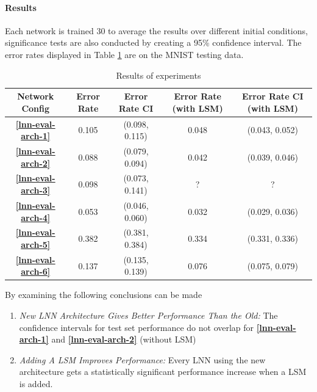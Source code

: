\paragraph{Results}
Each network is trained 30 to average the results over different initial conditions, significance tests are also conducted by creating a 95\% confidence interval. The error rates displayed in Table \ref{tab:mnist-peformance-results} are on the MNIST testing data.

\begin{table}[H]
	\begin{center}
		\begin{tabular}{| c | c | c | c | c |}
			\hline
			\textbf{Network Config} & \textbf{Error Rate} & \textbf{Error Rate CI} & \textbf{Error Rate (with LSM)} & \textbf{Error Rate CI (with LSM)}\\
			\hline
			\hline
			\textbf{\ref{lnn-eval-arch-1}} & 0.105 & (0.098, 0.115) & 0.048 & (0.043, 0.052)\\
			\textbf{\ref{lnn-eval-arch-2}} & 0.088 & (0.079, 0.094) & 0.042 & (0.039, 0.046)\\
			\textbf{\ref{lnn-eval-arch-3}} & 0.098 & (0.073, 0.141) & ? & ?\\
			\textbf{\ref{lnn-eval-arch-4}} & 0.053 & (0.046, 0.060) & 0.032 & (0.029, 0.036)\\
			\textbf{\ref{lnn-eval-arch-5}} & 0.382 & (0.381, 0.384) & 0.334 & (0.331, 0.336)\\
			\textbf{\ref{lnn-eval-arch-6}} & 0.137 & (0.135, 0.139) & 0.076 & (0.075, 0.079)\\
			\hline
		\end{tabular}
	\end{center}
	\caption{Results of experiments}
	\label{tab:mnist-peformance-results}
\end{table}

By examining the following conclusions can be made
\begin{enumerate}
	\item \textit{New LNN Architecture Gives Better Performance Than the Old:} The confidence intervals for test set performance do not overlap for \textbf{\ref{lnn-eval-arch-1}} and \textbf{\ref{lnn-eval-arch-2}} (without LSM)
	
	\item \textit{Adding A LSM Improves Performance:} Every LNN using the new architecture gets a statistically significant performance increase when a LSM is added.
\end{enumerate}


